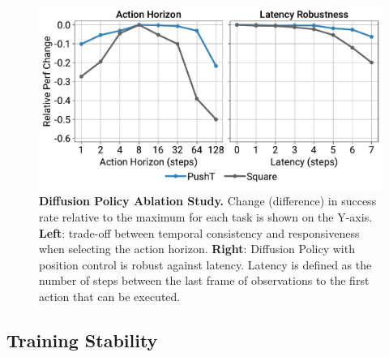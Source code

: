 \begin{figure}[h]
\centering
\includegraphics[width=\linewidth]{figure/ablation_figure.pdf}
\vspace{-6mm}

\caption{\textbf{Diffusion Policy Ablation Study.} 
Change (difference) in success rate relative to the maximum for each task is shown on the Y-axis.
\textbf{Left}: trade-off between temporal consistency and responsiveness when selecting the action horizon. 
\textbf{Right}: Diffusion Policy with position control is robust against latency.
Latency is defined as the number of steps between the last frame of observations to the first action that can be executed.
} 
\label{fig:ablation}
\vspace{-5mm}
\end{figure}




\subsection{Training Stability}
\label{sec:ibc_stability}

